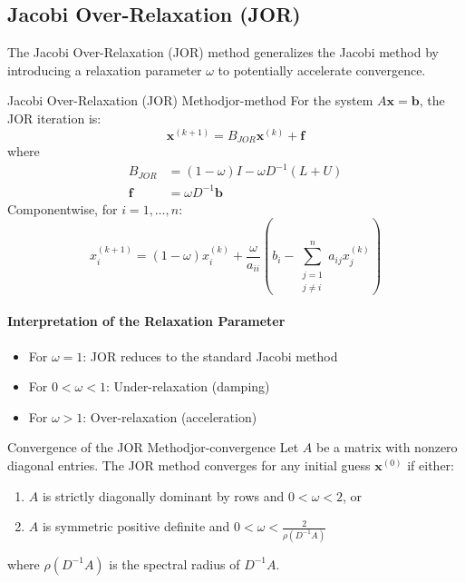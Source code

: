 \subsection{Jacobi Over-Relaxation (JOR)}

The Jacobi Over-Relaxation (JOR) method generalizes the Jacobi method by introducing a relaxation parameter $\omega$ to potentially accelerate convergence.

\begin{definition}{Jacobi Over-Relaxation (JOR) Method}{jor-method}
    For the system $A\mathbf{x} = \mathbf{b}$, the JOR iteration is:
    \begin{equation}
        \mathbf{x}^{(k+1)} = B_{JOR} \mathbf{x}^{(k)} + \mathbf{f}
    \end{equation}
    where
    \begin{align}
        B_{JOR} &= (1-\omega)I - \omega D^{-1}(L + U) \\
        \mathbf{f} &= \omega D^{-1}\mathbf{b}
    \end{align}
    Componentwise, for $i = 1, \ldots, n$:
    \begin{equation}
        x_i^{(k+1)} = (1-\omega)x_i^{(k)} + \frac{\omega}{a_{ii}}\left(b_i - \sum_{\substack{j=1 \\ j \neq i}}^n a_{ij} x_j^{(k)}\right)
    \end{equation}
\end{definition}

\paragraph{Interpretation of the Relaxation Parameter}
\begin{itemize}
    \item For $\omega = 1$: JOR reduces to the standard Jacobi method
    \item For $0 < \omega < 1$: Under-relaxation (damping)
    \item For $\omega > 1$: Over-relaxation (acceleration)
\end{itemize}

\begin{theorem}{Convergence of the JOR Method}{jor-convergence}
    Let $A$ be a matrix with nonzero diagonal entries. The JOR method converges for any initial guess $\mathbf{x}^{(0)}$ if either:
    \begin{enumerate}
        \item $A$ is strictly diagonally dominant by rows and $0 < \omega < 2$, or
        \item $A$ is symmetric positive definite and $0 < \omega < \frac{2}{\rho(D^{-1}A)}$
    \end{enumerate}
    where $\rho(D^{-1}A)$ is the spectral radius of $D^{-1}A$.
\end{theorem}


